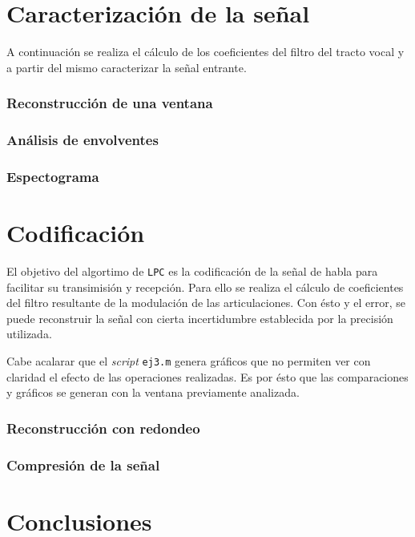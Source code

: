 \documentclass[10pt,a4paper]{article}
\begin{document}
		
	\setcounter{page}{1}

	\part{Caracterización de la señal}
		A continuación se realiza el cálculo de los coeficientes del filtro del tracto vocal y a partir del mismo caracterizar la señal entrante.

	
		\section{Reconstrucción de una ventana}
			

		\section{Análisis de envolventes}
			

			\pagebreak
		\section{Espectograma}
			

	\part{Codificación}
		El objetivo del algortimo de \texttt{LPC} es la codificación de la señal de habla para facilitar su transimisión y recepción. Para ello se realiza el cálculo de coeficientes del filtro resultante de la modulación de las articulaciones. Con ésto y el error, se puede reconstruir la señal con cierta incertidumbre establecida por la precisión utilizada.

		Cabe acalarar que el \emph{script} \texttt{ej3.m} genera gráficos que no permiten ver con claridad el efecto de las operaciones realizadas. Es por ésto que las comparaciones y gráficos se generan con la ventana previamente analizada.
		
		\section{Reconstrucción con redondeo}
			

		\section{Compresión de la señal}
			
	

	\part{Conclusiones}\label{part:conclusiones}
		

\end{document}
